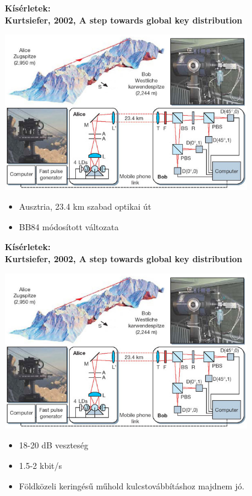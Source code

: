 \documentclass{beamer}
\begin{document}
    \begin{frame}

        \center

        \textbf{Kísérletek:\\
            Kurtsiefer, 2002, A step towards global key distribution}

        \includegraphics[width=0.8\textwidth]{austria_kurtsiefer.jpg}

        \begin{itemize}
            \item Ausztria, 23.4 km szabad optikai út
            \item BB84 módosított változata
        \end{itemize}

    \end{frame}

    \begin{frame}

        \center

        \textbf{Kísérletek:\\
            Kurtsiefer, 2002, A step towards global key distribution}

        \includegraphics[width=0.8\textwidth]{austria_kurtsiefer.jpg}

        \begin{itemize}
            \item 18-20 dB veszteség
            \item 1.5-2 kbit/s
            \item Földközeli keringésű műhold kulcstovábbításhoz majdnem jó.
        \end{itemize}

    \end{frame}
\end{document}
